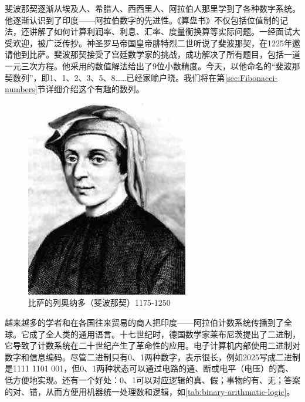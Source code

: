 \documentclass[b5paper]{article}
\begin{document}
斐波那契逐渐从埃及人、希腊人、西西里人、阿拉伯人那里学到了各种数字系统。他逐渐认识到了印度——阿拉伯数字的先进性。《算盘书》不仅包括位值制的记法，还讲解了如何计算利润率、利息、汇率、度量衡换算等实际问题。一经面试大受欢迎，被广泛传抄。神圣罗马帝国皇帝腓特烈二世听说了斐波那契，在1225年邀请他到比萨。斐波那契接受了宫廷数学家的挑战，成功解决了所有题目，包括一道一元三次方程。他采用的数值解法给出了9位小数精度\cite{Gies-Carney-24}。今天，以他命名的“斐波那契数列”，即1、1、2、3、5、8……已经家喻户晓。我们将在第\ref{sec:Fibonacci-numbers}节详细介绍这个有趣的数列。

\begin{figure}[htbp]
 \centering
 \includegraphics[scale=0.35]{img/Fibonacci}
 \caption{比萨的列奥纳多（斐波那契）1175-1250}
 \label{fig:Fibonacci}
\end{figure}

\label{sec:binary-numerals} 
越来越多的学者和在各国往来贸易的商人把印度——阿拉伯计数系统传播到了全球。它成了全人类的通用语言。十七世纪时，德国数学家莱布尼茨提出了二进制，它导致了计数系统在二十世纪产生了革命性的应用。电子计算机内部使用二进制对数字和信息编码。尽管二进制只有0、1两种数字，表示很长，例如2025写成二进制是1111 1101 001，但0、1两种状态可以通过电路的通、断或电平（电压）的高、低方便地实现。还有一个好处：0、1可以对应逻辑的真、假；事物的有、无；答案的对、错，从而方便用机器统一处理数和逻辑，如\cref{tab:binary-arithmatic-logic}。
\end{document}
